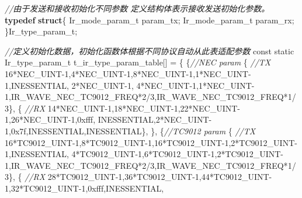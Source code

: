 \documentclass[
  12pt,
]{book}
\newenvironment{Shaded}{\begin{snugshade}}{\end{snugshade}}
\newcommand{\BaseNTok}[1]{\textcolor[rgb]{0.00,0.00,0.81}{#1}}
\newcommand{\CommentTok}[1]{\textcolor[rgb]{0.56,0.35,0.01}{\textit{#1}}}
\newcommand{\DataTypeTok}[1]{\textcolor[rgb]{0.13,0.29,0.53}{#1}}
\newcommand{\DecValTok}[1]{\textcolor[rgb]{0.00,0.00,0.81}{#1}}
\newcommand{\KeywordTok}[1]{\textcolor[rgb]{0.13,0.29,0.53}{\textbf{#1}}}
\newcommand{\NormalTok}[1]{#1}
\begin{document}
\begin{Shaded}
\begin{Highlighting}[]
{{\CommentTok{//由于发送和接收初始化不同参数 定义结构体表示接收发送初始化参数。}
\KeywordTok{typedef} \KeywordTok{struct}\NormalTok{\{}
\NormalTok{    Ir_mode_param_t param_tx;}
\NormalTok{    Ir_mode_param_t param_rx;}
\NormalTok{\}Ir_type_param_t;}

\CommentTok{//定义初始化数据，初始化函数体根据不同协议自动从此表适配参数}
\DataTypeTok{const} \DataTypeTok{static}\NormalTok{ Ir_type_param_t t_ir_type_param_table[] = }
\NormalTok{\{}
\NormalTok{    \{}\CommentTok{//NEC param}
\NormalTok{        \{  }\CommentTok{//TX}
            \DecValTok{16}\NormalTok{*NEC_UINT-}\DecValTok{1}\NormalTok{,}\DecValTok{4}\NormalTok{*NEC_UINT-}\DecValTok{1}\NormalTok{,}\DecValTok{8}\NormalTok{*NEC_UINT-}\DecValTok{1}\NormalTok{,}\DecValTok{1}\NormalTok{*NEC_UINT-}\DecValTok{1}\NormalTok{,INESSENTIAL,}
            \DecValTok{2}\NormalTok{*NEC_UINT-}\DecValTok{1}\NormalTok{, }\DecValTok{4}\NormalTok{*NEC_UINT-}\DecValTok{1}\NormalTok{,}\DecValTok{1}\NormalTok{*NEC_UINT-}\DecValTok{1}\NormalTok{,IR_WAVE_NEC_TC9012_FREQ*}\DecValTok{2}\NormalTok{/}\DecValTok{3}\NormalTok{,IR_WAVE_NEC_TC9012_FREQ*}\DecValTok{1}\NormalTok{/}\DecValTok{3}\NormalTok{\},}
\NormalTok{        \{   }\CommentTok{//RX}
            \DecValTok{14}\NormalTok{*NEC_UINT-}\DecValTok{1}\NormalTok{,}\DecValTok{18}\NormalTok{*NEC_UINT-}\DecValTok{1}\NormalTok{,}\DecValTok{22}\NormalTok{*NEC_UINT-}\DecValTok{1}\NormalTok{,}\DecValTok{26}\NormalTok{*NEC_UINT-}\DecValTok{1}\NormalTok{,}\BaseNTok{0xfff}\NormalTok{,}
\NormalTok{            INESSENTIAL,}\DecValTok{2}\NormalTok{*NEC_UINT-}\DecValTok{1}\NormalTok{,}\BaseNTok{0x7f}\NormalTok{,INESSENTIAL,INESSENTIAL\},    }
\NormalTok{    \},}
\NormalTok{    \{}\CommentTok{//TC9012 param}
\NormalTok{        \{   }\CommentTok{//TX}
            \DecValTok{16}\NormalTok{*TC9012_UINT-}\DecValTok{1}\NormalTok{,}\DecValTok{8}\NormalTok{*TC9012_UINT-}\DecValTok{1}\NormalTok{,}\DecValTok{16}\NormalTok{*TC9012_UINT-}\DecValTok{1}\NormalTok{,}\DecValTok{2}\NormalTok{*TC9012_UINT-}\DecValTok{1}\NormalTok{,INESSENTIAL,}
            \DecValTok{4}\NormalTok{*TC9012_UINT-}\DecValTok{1}\NormalTok{,}\DecValTok{6}\NormalTok{*TC9012_UINT-}\DecValTok{1}\NormalTok{,}\DecValTok{2}\NormalTok{*TC9012_UINT-}\DecValTok{1}\NormalTok{,IR_WAVE_NEC_TC9012_FREQ*}\DecValTok{2}\NormalTok{/}\DecValTok{3}\NormalTok{,IR_WAVE_NEC_TC9012_FREQ*}\DecValTok{1}\NormalTok{/}\DecValTok{3}\NormalTok{\},}
\NormalTok{        \{    }\CommentTok{//RX}
            \DecValTok{28}\NormalTok{*TC9012_UINT-}\DecValTok{1}\NormalTok{,}\DecValTok{36}\NormalTok{*TC9012_UINT-}\DecValTok{1}\NormalTok{,}\DecValTok{44}\NormalTok{*TC9012_UINT-}\DecValTok{1}\NormalTok{,}\DecValTok{32}\NormalTok{*TC9012_UINT-}\DecValTok{1}\NormalTok{,}\BaseNTok{0xfff}\NormalTok{,INESSENTIAL,}
}}
\end{Highlighting}
\end{Shaded}
\end{document}

